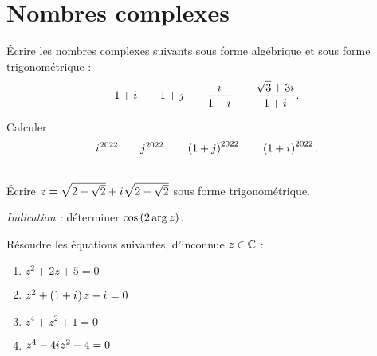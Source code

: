 \chapter{Nombres complexes}

\minitoc

\begin{exo}
Écrire les nombres complexes suivants sous forme algébrique et sous forme trigonométrique : \[1+i\mkern1mu\qquad1+j\qquad\dfrac{i\mkern1mu}{1-i\mkern1mu}\qquad\dfrac{\sqrt{3}+3i\mkern1mu}{1+i\mkern1mu}.\]
\end{exo}

\begin{corr}
\end{corr}

\begin{exo}
Calculer \[i\mkern1mu^{2022}\qquad j^{2022}\qquad\left(1+j\right)^{2022}\qquad\left(1+i\mkern1mu\right)^{2022}.\]
\end{exo}

\begin{corr}
\end{corr}

\begin{exo}~\\
Écrire \(z=\sqrt{2+\sqrt{2}}+i\mkern1mu\sqrt{2-\sqrt{2}}\) sous forme trigonométrique.

\textit{Indication :} déterminer \(\cos\left(2\arg z\right)\).
\end{exo}

\begin{corr}
\end{corr}

\begin{exo}
Résoudre les équations suivantes, d'inconnue \(z\in\mathbb{C}\) :

\begin{enumerate}
\item \(z^2+2z+5=0\) \\

\item \(z^2+\left(1+i\mkern1mu\right)z-i\mkern1mu=0\) \\

\item \(z^4+z^2+1=0\) \\

\item \(z^4-4i\mkern1mu z^2-4=0\)
\end{enumerate}
\end{exo}

\begin{corr}
\end{corr}

